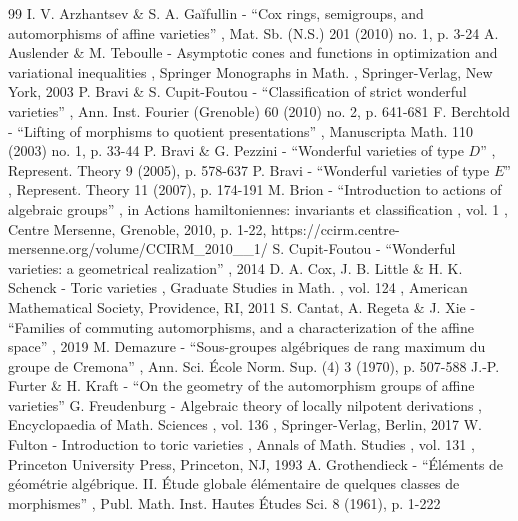 \documentclass[11pt]{article}
\numberwithin{equation}{section}
\theoremstyle{plain}
\theoremstyle{definition}
\begin{document}

\begin{thebibliography}{99}
 I. V. Arzhantsev \& S. A. Gaĭfullin - “Cox rings, semigroups, and automorphisms of affine varieties” , Mat. Sb. (N.S.) 201 (2010) no. 1, p. 3-24
 A. Auslender \& M. Teboulle - Asymptotic cones and functions in optimization and variational inequalities , Springer Monographs in Math. , Springer-Verlag, New York, 2003
 P. Bravi \& S. Cupit-Foutou - “Classification of strict wonderful varieties” , Ann. Inst. Fourier (Grenoble) 60 (2010) no. 2, p. 641-681
 F. Berchtold - “Lifting of morphisms to quotient presentations” , Manuscripta Math. 110 (2003) no. 1, p. 33-44
 P. Bravi \& G. Pezzini - “Wonderful varieties of type $D$” , Represent. Theory 9 (2005), p. 578-637
 P. Bravi - “Wonderful varieties of type $E$” , Represent. Theory 11 (2007), p. 174-191
 M. Brion - “Introduction to actions of algebraic groups” , in Actions hamiltoniennes: invariants et classification , vol. 1 , Centre Mersenne, Grenoble, 2010, p. 1-22, https://ccirm.centre-mersenne.org/volume/CCIRM\_2010\_\_1/
 S. Cupit-Foutou - “Wonderful varieties: a geometrical realization” , 2014
 D. A. Cox, J. B. Little \& H. K. Schenck - Toric varieties , Graduate Studies in Math. , vol. 124 , American Mathematical Society, Providence, RI, 2011
 S. Cantat, A. Regeta \& J. Xie - “Families of commuting automorphisms, and a characterization of the affine space” , 2019
 M. Demazure - “Sous-groupes algébriques de rang maximum du groupe de Cremona” , Ann. Sci. École Norm. Sup. (4) 3 (1970), p. 507-588
 J.-P. Furter \& H. Kraft - “On the geometry of the automorphism groups of affine varieties”
 G. Freudenburg - Algebraic theory of locally nilpotent derivations , Encyclopaedia of Math. Sciences , vol. 136 , Springer-Verlag, Berlin, 2017
 W. Fulton - Introduction to toric varieties , Annals of Math. Studies , vol. 131 , Princeton University Press, Princeton, NJ, 1993
 A. Grothendieck - “Éléments de géométrie algébrique. II. Étude globale élémentaire de quelques classes de morphismes” , Publ. Math. Inst. Hautes Études Sci. 8 (1961), p. 1-222

\end{thebibliography}
\end{document}
